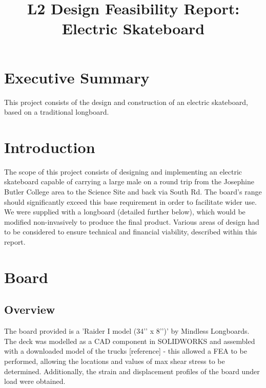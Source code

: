 \documentclass[journal,10pt]{IEEEtran}
\title{ \begin{huge}
\textbf{L2 Design Feasibility Report: Electric Skateboard} 
\end{huge} }
\begin{document}
\maketitle
\section{Executive Summary}
        This project consists of the design and construction of an electric skateboard, based on a traditional longboard.
    
\section{Introduction}
        The scope of this project consists of designing and implementing an electric skateboard capable of carrying a large male on a round trip from the Josephine Butler College area to the Science Site and back via South Rd. The board's range should significantly exceed this base requirement in order to facilitate wider use. We were supplied with a longboard (detailed further below), which would be modified non-invasively to produce the final product. Various areas of design had to be considered to ensure technical and financial viability, described within this report.
\section{Board}
    \subsection{Overview}
        The board provided is a 'Raider I model (34’’ x 8’’)’ by Mindless Longboards. The deck was modelled as a CAD component in SOLIDWORKS and assembled with a downloaded model of the trucks [reference] - this allowed a FEA to be performed, allowing the locations and values of max shear stress to be determined. Additionally, the strain and displacement profiles of the board under load were obtained.
\end{document}
